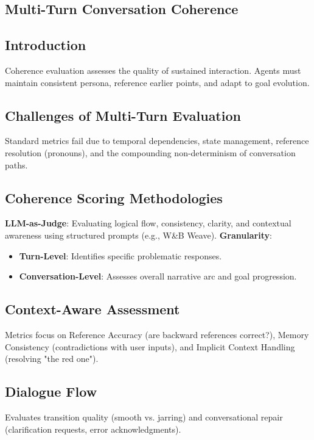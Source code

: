 \begin{TNtwocol}
\section{Multi-Turn Conversation Coherence }
\subsection{Introduction}
Coherence evaluation assesses the quality of sustained interaction. Agents must maintain consistent persona, reference earlier points, and adapt to goal evolution.

\subsection{Challenges of Multi-Turn Evaluation}
Standard metrics fail due to temporal dependencies, state management, reference resolution (pronouns), and the compounding non-determinism of conversation paths.

\subsection{Coherence Scoring Methodologies}
\textbf{LLM-as-Judge}: Evaluating logical flow, consistency, clarity, and contextual awareness using structured prompts (e.g., W\&B Weave).
\textbf{Granularity}:
\begin{itemize}
    \item \textbf{Turn-Level}: Identifies specific problematic responses.
    \item \textbf{Conversation-Level}: Assesses overall narrative arc and goal progression.
\end{itemize}

\subsection{Context-Aware Assessment}
Metrics focus on Reference Accuracy (are backward references correct?), Memory Consistency (contradictions with user inputs), and Implicit Context Handling (resolving "the red one").

\subsection{Dialogue Flow}
Evaluates transition quality (smooth vs. jarring) and conversational repair (clarification requests, error acknowledgments).
\end{TNtwocol}
